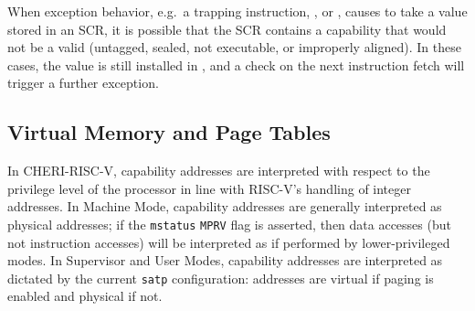 When exception behavior, e.g.\ a trapping instruction, ,
or \xRET{}, causes \PCC{} to take a value stored in an SCR, it is possible that
the SCR contains a capability that would not be a valid \PCC{} (untagged,
sealed, not executable, or improperly aligned).
In these cases, the value is still installed in \PCC{}, and a check on the next
instruction fetch will trigger a further exception.

%
%
%

\subsection{Virtual Memory and Page Tables}
\label{subsection:riscv:pagetables}

In CHERI-RISC-V, capability addresses are interpreted with respect to the
privilege level of the processor in line with RISC-V's handling of integer
addresses.
%
In Machine Mode, capability addresses are generally interpreted as physical
addresses; if the \texttt{mstatus} \texttt{MPRV} flag is asserted, then data
accesses (but not instruction accesses) will be interpreted as if performed by
lower-privileged modes.
%
In Supervisor and User Modes, capability addresses are interpreted as dictated
by the current \texttt{satp} configuration: addresses are virtual if paging is
enabled and physical if not.
%

